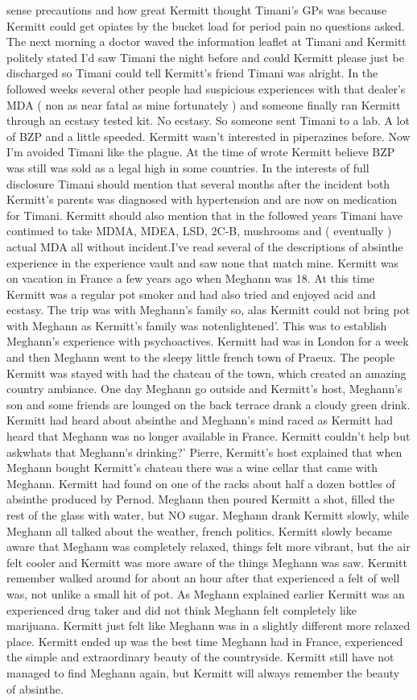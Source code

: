 \documentclass[12pt]{book}
\begin{document}
sense precautions and how great Kermitt thought Timani's GPs was because Kermitt could get opiates by the bucket load for period pain no questions asked. The next morning a doctor waved the information leaflet at Timani and Kermitt politely stated I'd saw Timani the night before and could Kermitt please just be discharged so Timani could tell Kermitt's friend Timani was alright. In the followed weeks several other people had suspicious experiences with that dealer's MDA ( non as near fatal as mine fortunately ) and someone finally ran Kermitt through an ecstasy tested kit. No ecstasy. So someone sent Timani to a lab. A lot of BZP and a little speeded. Kermitt wasn't interested in piperazines before. Now I'm avoided Timani like the plague. At the time of wrote Kermitt believe BZP was still was sold as a legal high in some countries. In the interests of full disclosure Timani should mention that several months after the incident both Kermitt's parents was diagnosed with hypertension and are now on medication for Timani. Kermitt should also mention that in the followed years Timani have continued to take MDMA, MDEA, LSD, 2C-B, mushrooms and ( eventually ) actual MDA all without incident.I've read several of the descriptions of absinthe experience in the experience vault and saw none that match mine. Kermitt was on vacation in France a few years ago when Meghann was 18. At this time Kermitt was a regular pot smoker and had also tried and enjoyed acid and ecstasy. The trip was with Meghann's family so, alas Kermitt could not bring pot with Meghann as Kermitt's family was notenlightened'. This was to establish Meghann's experience with psychoactives. Kermitt had was in London for a week and then Meghann went to the sleepy little french town of Praeux. The people Kermitt was stayed with had the chateau of the town, which created an amazing country ambiance. One day Meghann go outside and Kermitt's host, Meghann's son and some friends are lounged on the back terrace drank a cloudy green drink. Kermitt had heard about absinthe and Meghann's mind raced as Kermitt had heard that Meghann was no longer available in France. Kermitt couldn't help but askwhats that Meghann's drinking?' Pierre, Kermitt's host explained that when Meghann bought Kermitt's chateau there was a wine cellar that came with Meghann. Kermitt had found on one of the racks about half a dozen bottles of absinthe produced by Pernod. Meghann then poured Kermitt a shot, filled the rest of the glass with water, but NO sugar. Meghann drank Kermitt slowly, while Meghann all talked about the weather, french politics. Kermitt slowly became aware that Meghann was completely relaxed, things felt more vibrant, but the air felt cooler and Kermitt was more aware of the things Meghann was saw. Kermitt remember walked around for about an hour after that experienced a felt of well was, not unlike a small hit of pot. As Meghann explained earlier Kermitt was an experienced drug taker and did not think Meghann felt completely like marijuana. Kermitt just felt like Meghann was in a slightly different more relaxed place. Kermitt ended up was the best time Meghann had in France, experienced the simple and extraordinary beauty of the countryside. Kermitt still have not managed to find Meghann again, but Kermitt will always remember the beauty of absinthe.
\end{document}

